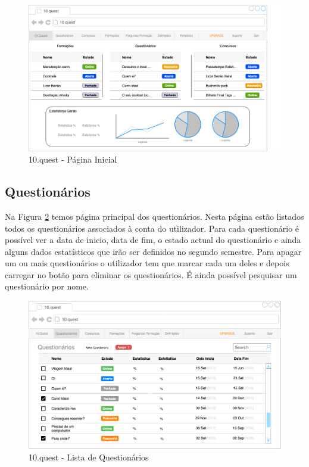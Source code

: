 \begin{figure}[ht!]
	\begin{center}
		\includegraphics[width=1\textwidth]{img/prototipos/home.png}
		\caption{10.quest - Página Inicial}
		\label{10q-home}
	\end{center}
\end{figure}
\newpage

\subsection{Questionários}

Na Figura  \ref{10q-listaQ} temos página principal dos questionários. Nesta página estão listados todos os questionários associados à conta do utilizador. Para cada questionário é possível ver a data de inicio, data de fim, o estado actual do questionário e ainda alguns dados estatísticos que irão ser definidos no segundo semestre.
Para  apagar um ou mais questionários o utilizador tem que marcar cada um deles e depois carregar no botão para eliminar os questionários. É ainda possível pesquisar um questionário por nome.

\begin{figure}[ht!]
	\begin{center}
		\includegraphics[width=1\textwidth]{img/prototipos/4.png}
		\caption{10.quest - Lista de Questionários }
		\label{10q-listaQ}
	\end{center}
\end{figure}


